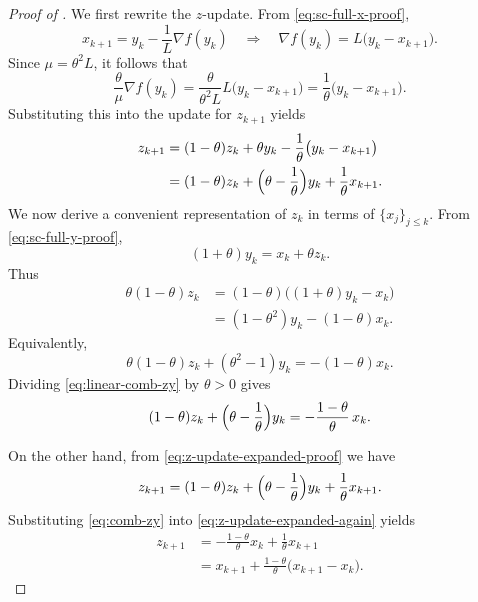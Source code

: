 \documentclass[10pt]{article}
\begin{document}
\begin{proof}[Proof of ]
We first rewrite the \(z\)-update.
From \eqref{eq:sc-full-x-proof},
\[
x_{k+1} = y_k - \frac{1}{L}\nabla f(y_k)
\quad\Longrightarrow\quad
\nabla f(y_k) = L\bigl(y_k-x_{k+1}\bigr).
\]
Since \(\mu=\theta^2 L\), it follows that
\[
\frac{\theta}{\mu}\nabla f(y_k)
=
\frac{\theta}{\theta^2 L}L\bigl(y_k-x_{k+1}\bigr)
=
\frac{1}{\theta}\bigl(y_k-x_{k+1}\bigr).
\]
Substituting this into the update for \(z_{k+1}\) yields
\begin{align}
z_{k+1}
&=
(1-\theta)z_k + \theta y_k - \frac{1}{\theta}\bigl(y_k-x_{k+1}\bigr)
\nonumber\\
&=
(1-\theta)z_k + \Bigl(\theta-\frac{1}{\theta}\Bigr)y_k + \frac{1}{\theta}x_{k+1}.
\label{eq:z-update-expanded-proof}
\end{align}
We now derive a convenient representation of \(z_k\) in terms of
\(\{x_j\}_{j\le k}\).
From \eqref{eq:sc-full-y-proof},
\begin{equation}
(1+\theta) y_k = x_k + \theta z_k.
\label{eq:y-relation}
\end{equation}
Thus
\begin{align}
\theta(1-\theta) z_k
&= (1-\theta)\bigl((1+\theta) y_k - x_k\bigr) \nonumber\\
&= (1-\theta^2) y_k - (1-\theta) x_k.
\label{eq:theta1-theta-z}
\end{align}
Equivalently,
\begin{equation}
\theta(1-\theta) z_k + (\theta^2 - 1) y_k = -(1-\theta) x_k.
\label{eq:linear-comb-zy}
\end{equation}
Dividing \eqref{eq:linear-comb-zy} by \(\theta>0\) gives
\begin{equation}
(1-\theta) z_k + \Bigl(\theta - \frac{1}{\theta}\Bigr) y_k
= -\frac{1-\theta}{\theta}\,x_k.
\label{eq:comb-zy}
\end{equation}

On the other hand, from \eqref{eq:z-update-expanded-proof} we have
\begin{equation}
z_{k+1}
=
(1-\theta) z_k + \Bigl(\theta - \frac{1}{\theta}\Bigr) y_k + \frac{1}{\theta} x_{k+1}.
\label{eq:z-update-expanded-again}
\end{equation}
Substituting \eqref{eq:comb-zy} into \eqref{eq:z-update-expanded-again} yields
\begin{align}
z_{k+1}
&= -\frac{1-\theta}{\theta} x_k + \frac{1}{\theta} x_{k+1} \nonumber\\
&= x_{k+1} + \frac{1-\theta}{\theta}\bigl(x_{k+1}-x_k\bigr).
\label{eq:z-kplus1-x}
\end{align}


\end{proof}
\end{document}
